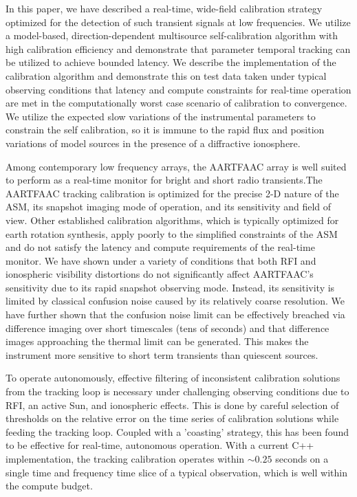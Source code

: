 \documentclass{aa}
\begin{document}
In this  paper, we have  described a real-time, wide-field  calibration strategy
optimized for  the detection of such  transient signals at  low frequencies.  We
utilize   a   model-based,   direction-dependent  multisource   self-calibration
algorithm  with  high  calibration  efficiency and  demonstrate  that  parameter
temporal tracking can  be utilized to achieve bounded  latency.  We describe the
implementation of  the calibration algorithm  and demonstrate this on  test data
taken under  typical observing conditions  that latency and  compute constraints
for real-time  operation are met in  the computationally worst  case scenario of
calibration  to convergence.   We utilize  the expected  slow variations  of the
instrumental parameters  to constrain the self  calibration, so it  is immune to
the rapid  flux and position  variations of model  sources in the presence  of a
diffractive ionosphere.

Among  contemporary low  frequency  arrays, the  \mbox{AARTFAAC}  array is  well
suited  to  perform   as  a  real-time  monitor  for   bright  and  short  radio
transients.The \mbox{AARTFAAC} tracking calibration is optimized for the precise
2-D  nature  of  the ASM,  its  snapshot  imaging  mode  of operation,  and  its
sensitivity and field of  view.  Other established calibration algorithms, which
is  typically  optimized for  earth  rotation  synthesis,  apply poorly  to  the
simplified constraints  of the ASM  and do not  satisfy the latency  and compute
requirements  of  the real-time  monitor.   We have  shown  under  a variety  of
conditions  that  both  RFI   and  ionospheric  visibility  distortions  do  not
significantly  affect \mbox{AARTFAAC's}  sensitivity due  to its  rapid snapshot
observing  mode.  Instead,  its sensitivity  is limited  by  classical confusion
noise caused  by its relatively coarse  resolution.  We have  further shown that
the confusion  noise limit  can be effectively  breached via  difference imaging
over short timescales (tens of  seconds) and that difference images approaching
the thermal limit can be generated.  This makes the instrument more sensitive to
short term transients than quiescent sources.

To  operate  autonomously,   effective  filtering  of  inconsistent  calibration
solutions  from  the tracking  loop  is  necessary  under challenging  observing
conditions due to  RFI, an active Sun, and ionospheric effects.   This is done by
careful  selection of  thresholds on  the relative  error on  the  time series of
calibration solutions while feeding the tracking loop. Coupled with a 'coasting'
strategy,  this  has  been  found  to be  effective  for  real-time,  autonomous
operation. With a current  C++ implementation, the tracking calibration operates
within $\sim$$0.25$ seconds on a single time and frequency time slice of a typical
observation, which is well within the compute budget.
\end{document}

